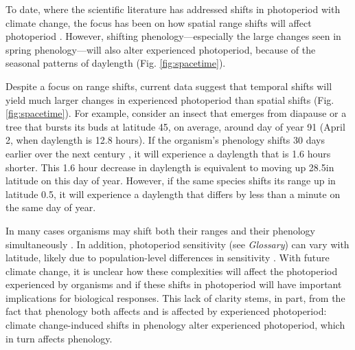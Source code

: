 \documentclass{article}
\begin{document}
\par To date, where the scientific literature has addressed shifts in photoperiod with climate change, the focus has been on how spatial range shifts will affect photoperiod \citep[e.g.,][]{saikkonen2012,way2015}. However, shifting phenology---especially the large changes seen in spring phenology---will also alter experienced photoperiod, because of the seasonal patterns of daylength (Fig. \ref{fig:spacetime}). 

\par Despite a focus on range shifts, current data suggest that temporal shifts will yield much larger changes in experienced photoperiod than spatial shifts (Fig. \ref{fig:spacetime}). %
For example, consider an insect that emerges from diapause or a tree that bursts its buds at latitude 45\degree, on average, around day of year 91 (April 2, when daylength is 12.8 hours). If the organism's phenology shifts 30 days earlier over the next century \citep[i.e., a rate of ~3 days per decade, as has been observed,][]{parmesan2003}, it will experience a daylength that is 1.6 hours shorter. This 1.6 hour decrease in daylength is equivalent to moving up 28.5\degree  in latitude on this day of year. However, if the same species shifts its range up in latitude 0.5\degree  \citep[i.e., 60 km over the next century,  comparable to observed rates,][]{parmesan2003,chen2011}, it will experience a daylength that differs by less than a minute on the same day of year. 

\par In many cases organisms may shift both their ranges and their phenology simultaneously \citep[i.e., due to new climatic conditions,][]{duputie2015,grevstad2015}. In addition, photoperiod sensitivity (see \emph{Glossary}) can vary with latitude, likely due to population-level differences in sensitivity \citep{Caffarra:2011b,gauzere2017,Howe:1996,Partanen:2005aa,saikkonen2012,Vihera-Aarnio:2006aa}.
With future climate change, it is unclear how these complexities will affect the photoperiod experienced by organisms and if these shifts in photoperiod will have important implications for biological responses. This lack of clarity stems, in part, from the fact that phenology both affects and is affected by experienced photoperiod: climate change-induced shifts in phenology alter experienced photoperiod, which in turn affects phenology.%
\end{document}
